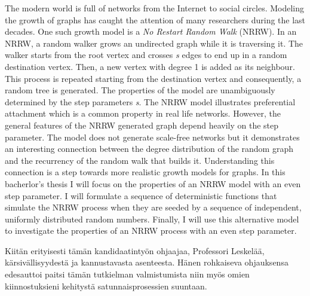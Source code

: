 \documentclass[finnish, 12pt, a4paper, sci, utf8, pdfa]{aaltothesis}
\begin{document}
\newpage
\begin{abstractpage}[english]
The modern world is full of networks from the Internet to social circles. Modeling the growth
of graphs has caught the attention of many researchers during the last decades. One such growth model
is a \textit{No Restart Random Walk} (NRRW). In an NRRW, a random walker grows
an undirected graph while it is traversing it. The walker starts from the root vertex and crosses \textit{s}
edges to end up in a random destination vertex. Then, a new vertex with degree 1 is added as its neighbour. 
This process is repeated starting from the destination vertex and consequently, a random tree is generated. 
The properties of the model are unambiguously determined by the step parameters \textit{s}.
The NRRW model illustrates preferential attachment which is a common property in real life networks.
However, the general features of the NRRW generated graph depend heavily on the step parameter.
The model does not generate scale-free networks but it demonstrates an interesting connection between
the degree distribution of the random graph and the recurrency of the random walk that builds it.
Understanding this connection is a step towards more realistic growth models for graphs. In this bacherlor's thesis
I will focus on the properties of an NRRW model with an even step parameter. I will formulate a sequence of
deterministic functions that simulate the NRRW process when they are seeded by a sequence of independent,
uniformly distributed random numbers. Finally, I will use this alternative model to investigate the properties of
an NRRW process with an even step parameter.
\end{abstractpage}

\newpage

Kiitän erityisesti tämän kandidaatintyön ohjaajaa, Professori Leskelää, kärsivällisyydestä ja kannustavasta asenteesta. Hänen rohkaiseva ohjauksensa
edesauttoi paitsi tämän tutkielman valmistumista niin myös omien kiinnostuksieni kehitystä satunnaisprosessien suuntaan.
\end{document}

